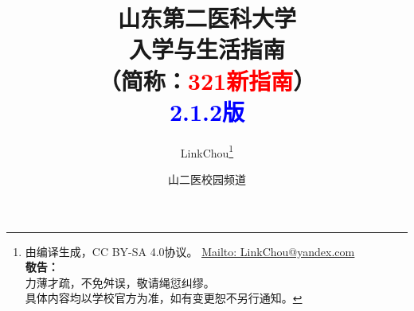 

\title{%
\normalsize
{\Huge\textbf{山东第二医科大学\\[6pt]入学与生活指南}}\\[6pt]
（简称：\textcolor{red}{321新指南}）\\[25pt]
{\large\textcolor{blue}{\textbf{2.1.2}版}}\vspace*{-25pt}}
\author{LinkChou\thanks{由\LaTeXe 编译生成，CC BY-SA 4.0协议。%
        \uline{\href{Mailto:LinkChou@yandex.com}{Mailto: LinkChou@yandex.com}}\\%
        \textbf{敬告：}\\%
        \indent\indent 力薄才疏，不免舛误，敬请绳愆纠缪。\\%
        \indent\indent 具体内容均以学校官方为准，如有变更恕不另行通知。}\and 山二医校园频道}
\date{\DTMnow}
\maketitle

\renewcommand{\thefootnote}{\arabic{footnote}}

\tableofcontents